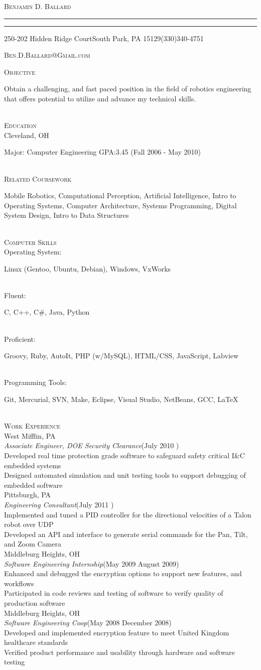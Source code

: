 \documentclass[11pt,letterpaper]{article}
\makeatletter
\newcommand{\name}{\textsc{Benjamin D. Ballard}}
\newcommand{\address}{\footnotesize 250-202 Hidden Ridge Court\hspace{2px}\textbullet\hspace{2px}South Park, PA 15129\hspace{2px}\textbullet\hspace{2px}(330)340-4751}
\newcommand{\email}{\textsc{Ben.D.Ballard@Gmail.com}}
\newcommand{\SkillItem}[2]{\hspace*{.5in}#1\hfill\begin{minipage}[t]{5.6in} #2 \end{minipage}\\}
\newcommand{\SectionHeader}[1]{\textsc{#1} \vspace{-2px}\\}
\newcommand{\CollegeHeader}[2]{\hspace*{.52in}{\bf#1} \hfill #2 \\}
\newcommand{\CompanyHeader}[4]{\hspace*{.52in}{\bf#1} \hfill #2 \\\hspace*{.5in}\emph{#3}\hfill (#4) \\}
\newcommand{\ResumeItem}[1]{\hspace*{.5in}\textopenbullet\hspace*{.2in}#1\\}
\newcommand{\TextBlock}[1]
{\hspace*{.5in} \begin{minipage}[t]{\textwidth -.5in} #1 \end{minipage}\\}
\newcommand{\ResumeHeader}{
\begin{center}
{

\linespread{0}

\Huge{\textsc{\name}}

\small
\nointerlineskip \vspace{4px}%
  \hspace{\fill}
\rule{\textwidth}{1px}
 \par\nointerlineskip \vspace{\baselineskip}
\nointerlineskip \vspace{0px}%
  \hspace{\fill}
\rule{\textwidth}{1px}
 \par \nointerlineskip \vspace{1px}
 \address \par \nointerlineskip \vspace{\baselineskip}
 \email
}
\end{center}
}
\makeatother
\begin{document}
\ResumeHeader
\vspace{-13px}

\SectionHeader{Objective}
\TextBlock{Obtain a challenging, and fast paced position in the field of robotics engineering that offers potential to utilize and advance my technical skills.}
\SectionHeader{Education}
\CollegeHeader{Case Western Reserve University}{Cleveland, OH}
\TextBlock{Major: Computer Engineering GPA:3.45 \hfill (Fall 2006 - May 2010)}
\SectionHeader{Related Coursework}
\TextBlock{Mobile Robotics, Computational Perception, Artificial Intelligence, Intro to Operating Systems, Computer Architecture, Systems Programming, Digital System Design, Intro to Data Structures}
\SectionHeader{Computer Skills}
\SkillItem{Operating System:}{Linux (Gentoo, Ubuntu, Debian), Windows, VxWorks}
\SkillItem{Fluent:}{C, C++, C\#, Java, Python}
\SkillItem{Proficient:}{Groovy, Ruby, AutoIt, PHP (w/MySQL), HTML/CSS, JavaScript, Labview}
\SkillItem{Programming Tools:}{Git, Mercurial, SVN, Make, Eclipse, Visual Studio, NetBeans, GCC, \LaTeX}
\SectionHeader{Work Experience}
\CompanyHeader{Bechtel Marine Propulsion Company (Bettis Atomic Power Laboratory)}{West Mifflin, PA}{Associate Engineer, DOE Security Clearance}{July 2010 \textendash { Present}}
\ResumeItem{Developed real time protection grade software to safeguard safety critical I\&{C} embedded systems}
\ResumeItem{Designed automated simulation and unit testing tools to support debugging of embedded software}
\CompanyHeader{Carnegie Robotics}{Pittsburgh, PA}{Engineering Consultant}{July 2011 \textendash { August 2011}}
\ResumeItem{Implemented and tuned a PID controller for the directional velocities of a Talon robot over UDP}
\ResumeItem{Developed an API and interface to generate serial commands for the Pan, Tilt, and Zoom Camera}
\CompanyHeader{Codonics}{Middleburg Heights, OH}{Software Engineering Internship}{May 2009 \textendash
 { }August 2009}
 \ResumeItem{Enhanced and debugged the encryption options to support new features, and workflows}
 \ResumeItem{Participated in code reviews and testing of software to verify quality of production software}
 \CompanyHeader{Codonics}{Middleburg Heights, OH}{Software Engineering Coop}{May 2008 \textendash
 { }December 2008}
 \ResumeItem{Developed and implemented encryption feature to meet United Kingdom healthcare standards}
 \ResumeItem{Verified product performance and usability through hardware and software testing}
\end{document}

